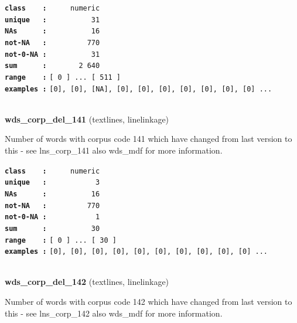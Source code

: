 \documentclass[]{article}
\begin{document}
\textbf{\texttt{class\ \ \ \ :}} \texttt{~~~~~numeric}\\
\textbf{\texttt{unique\ \ \ :}} \texttt{~~~~~~~~~~31}\\
\textbf{\texttt{NAs\ \ \ \ \ \ :}} \texttt{~~~~~~~~~~16}\\
\textbf{\texttt{not-NA\ \ \ :}} \texttt{~~~~~~~~~770}\\
\textbf{\texttt{not-0-NA\ :}} \texttt{~~~~~~~~~~31}\\
\textbf{\texttt{sum\ \ \ \ \ \ :}} \texttt{~~~~~~~2~640}\\
\textbf{\texttt{range\ \ \ \ :}}
\texttt{{[}\ 0\ {]}\ ...\ {[}\ 511\ {]}}\\
\textbf{\texttt{examples\ :}}
\texttt{{[}0{]},\ {[}0{]},\ {[}NA{]},\ {[}0{]},\ {[}0{]},\ {[}0{]},\ {[}0{]},\ {[}0{]},\ {[}0{]},\ {[}0{]}\ ...}\\

~

\textbf{wds\_corp\_del\_141} (textlines, linelinkage)

Number of words with corpus code 141 which have changed from last
version to this - see lns\_corp\_141 also wds\_mdf for more information.

\textbf{\texttt{class\ \ \ \ :}} \texttt{~~~~~numeric}\\
\textbf{\texttt{unique\ \ \ :}} \texttt{~~~~~~~~~~~3}\\
\textbf{\texttt{NAs\ \ \ \ \ \ :}} \texttt{~~~~~~~~~~16}\\
\textbf{\texttt{not-NA\ \ \ :}} \texttt{~~~~~~~~~770}\\
\textbf{\texttt{not-0-NA\ :}} \texttt{~~~~~~~~~~~1}\\
\textbf{\texttt{sum\ \ \ \ \ \ :}} \texttt{~~~~~~~~~~30}\\
\textbf{\texttt{range\ \ \ \ :}}
\texttt{{[}\ 0\ {]}\ ...\ {[}\ 30\ {]}}\\
\textbf{\texttt{examples\ :}}
\texttt{{[}0{]},\ {[}0{]},\ {[}0{]},\ {[}0{]},\ {[}0{]},\ {[}0{]},\ {[}0{]},\ {[}0{]},\ {[}0{]},\ {[}0{]}\ ...}\\

~

\textbf{wds\_corp\_del\_142} (textlines, linelinkage)

Number of words with corpus code 142 which have changed from last
version to this - see lns\_corp\_142 also wds\_mdf for more information.
\end{document}
